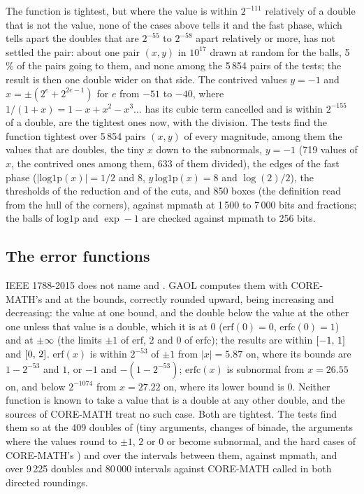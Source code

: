 \documentclass[12pt,a4paper,twoside,openright]{book}
\begin{document}
The function is tightest, but where the value is within $2^{-111}$
relatively of a double that is not the value, none of the cases above
tells it and the fast phase, which tells apart the doubles that are
$2^{-55}$ to $2^{-58}$ apart relatively or more, has not settled the pair:
about one pair $(x, y)$ in $10^{17}$ drawn at random for the balls, 5\,\%
of the pairs going to them, and none among the 5\,854 pairs of the tests;
the result is then one double wider on that side. The contrived values
$y=-1$ and $x=\pm(2^e+2^{2e-1})$ for $e$ from $-51$ to $-40$, where
$1/(1+x)=1-x+x^2-x^3\ldots$ has its cubic term cancelled and is within
$2^{-155}$ of a double, are the tightest ones now, with the division. The
tests find the function tightest over 5\,854 pairs $(x, y)$ of every
magnitude, among them the values that are doubles, the tiny $x$ down to
the subnormals, $y=-1$ (719 values of $x$, the contrived ones among them,
633 of them divided), the edges of the fast phase
($|\mathrm{log1p}(x)|=1/2$ and $8$, $y\,\mathrm{log1p}(x)=8$ and
$\log(2)/2$), the thresholds of the reduction and of the cuts, and 850
boxes (the definition read from the hull of the corners), against mpmath at
1\,500 to 7\,000 bits and fractions; the balls of $\mathrm{log1p}$ and
$\exp-1$ are checked against mpmath to 256 bits.

\subsection{The error functions}\label{sec:accuracy-erf}

IEEE 1788-2015 does not name  and . GAOL computes them
with CORE-MATH's  and  at the bounds, correctly
rounded upward,  being increasing and  decreasing: the
value at one bound, and the double below the value at the other one unless
that value is a double, which it is at $0$ ($\mathrm{erf}(0)=0$,
$\mathrm{erfc}(0)=1$) and at $\pm\infty$ (the limits $\pm1$ of
$\mathrm{erf}$, $2$ and $0$ of $\mathrm{erfc}$); the results are within
$[-1,\,1]$ and $[0,\,2]$. $\mathrm{erf}(x)$ is within $2^{-53}$ of
$\pm1$ from $|x|=5.87$ on, where its bounds are $1-2^{-53}$ and $1$, or
$-1$ and $-(1-2^{-53})$; $\mathrm{erfc}(x)$ is subnormal from $x=26.55$
on, and below $2^{-1074}$ from $x=27.22$ on, where its lower bound is $0$.
Neither function is known to take a value that is a double at any other
double, and the sources of CORE-MATH treat no such case.\newinvfive{} Both
are tightest. The tests find them so at the 409 doubles of
 (tiny arguments, changes of binade, the
arguments where the values round to $\pm1$, $2$ or $0$ or become subnormal,
and the hard cases of CORE-MATH's ) and over the intervals
between them, against mpmath, and over 9\,225 doubles and 80\,000 intervals
against CORE-MATH called in both directed roundings.
\end{document}
